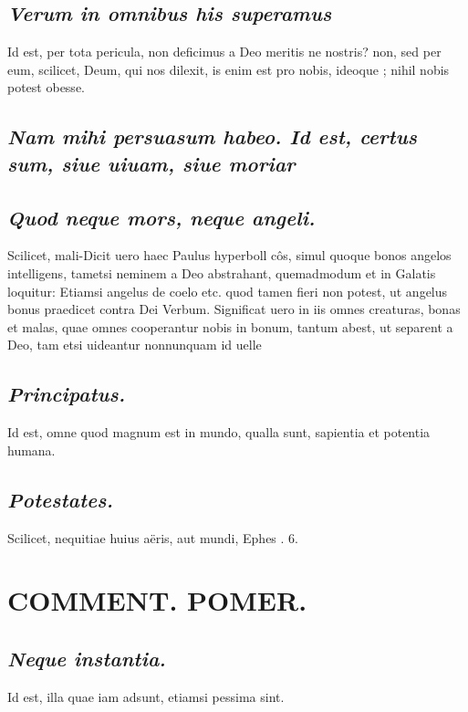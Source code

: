 \documentclass{article}
\begin{document}
\begin{pages}
\subsection*{\textit{Verum in omnibus his superamus }}\pstart Id est, per tota pericula, non deficimus a Deo meritis ne nostris? non, sed per eum, scilicet, Deum, qui nos dilexit, is enim est pro nobis, ideoque ; nihil nobis potest obesse.   \pend
{}
{}
\subsection*{\textit{Nam mihi persuasum habeo. Id est, certus sum, siue uiuam, siue moriar}}
{}
\subsection*{\textit{Quod neque mors, neque angeli. }}\pstart Scilicet, mali-Dicit uero haec Paulus hyperboll côs, simul quoque bonos angelos intelligens, tametsi neminem a Deo abstrahant, quemadmodum et in Galatis loquitur: Etiamsi angelus de coelo etc. quod tamen fieri non potest, ut angelus bonus praedicet contra Dei Verbum. Significat uero in iis omnes creaturas, bonas et malas, quae omnes cooperantur nobis in bonum, tantum abest, ut separent a Deo, tam etsi uideantur nonnunquam id uelle\pend
{}
{}
\subsection*{\textit{Principatus. }}\pstart Id est, omne quod magnum est in mundo, qualla sunt, sapientia et potentia humana.   \pend
{}
{}
\subsection*{\textit{Potestates. }}\pstart Scilicet, nequitiae huius aëris, aut mundi, Ephes . 6.   \pend
\section*{COMMENT. POMER.  }
{}
\subsection*{\textit{Neque instantia. }}\pstart Id est, illa quae iam adsunt, etiamsi pessima sint.   \pend
{}
{}

\end{pages}
\end{document}
